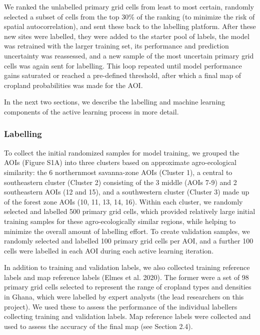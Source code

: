 \documentclass[11pt,a4paper]{article}
\begin{document}
We ranked the unlabelled primary grid cells from least to most certain,
randomly selected a subset of cells from the top 30\% of the ranking (to
minimize the risk of spatial autocorrelation), and sent these back to
the labelling platform. After these new sites were labelled, they were
added to the starter pool of labels, the model was retrained with the
larger training set, its performance and prediction uncertainty was
reassessed, and a new sample of the most uncertain primary grid cells
was again sent for labelling. This loop repeated until model performance
gains saturated or reached a pre-defined threshold, after which a final
map of cropland probabilities was made for the AOI.

In the next two sections, we describe the labelling and machine learning
components of the active learning process in more detail.

\hypertarget{labelling}{%
\subsubsection{Labelling}\label{labelling}}

To collect the initial randomized samples for model training, we grouped
the AOIs (Figure S1A) into three clusters based on approximate
agro-ecological similarity: the 6 northernmost savanna-zone AOIs
(Cluster 1), a central to southeastern cluster (Cluster 2) consisting of
the 3 middle (AOIs 7-9) and 2 southeastern AOIs (12 and 15), and a
southwestern cluster (Cluster 3) made up of the forest zone AOIs (10,
11, 13, 14, 16). Within each cluster, we randomly selected and labelled
500 primary grid cells, which provided relatively large initial training
samples for these agro-ecologically similar regions, while helping to
minimize the overall amount of labelling effort. To create validation
samples, we randomly selected and labelled 100 primary grid cells per
AOI, and a further 100 cells were labelled in each AOI during each
active learning iteration.

In addition to training and validation labels, we also collected
training reference labels and map reference labels (Elmes et al. 2020).
The former were a set of 98 primary grid cells selected to represent the
range of cropland types and densities in Ghana, which were labelled by
expert analysts (the lead researchers on this project). We used these to
assess the performance of the individual labellers collecting training
and validation labels. Map reference labels were collected and used to
assess the accuracy of the final map (see Section 2.4).
\end{document}
